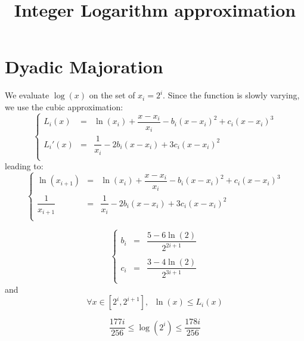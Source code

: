 \documentclass[aps]{revtex4}
\begin{document}
\title{Integer Logarithm approximation}
\maketitle

\section{Dyadic Majoration}
We evaluate $\log(x)$ on the set of $x_i=2^i$.
Since the function is slowly varying, we use the cubic approximation:
\begin{equation}
\left\lbrace
\begin{array}{rcl}
	L_i(x)  & = & \ln(x_i) + \dfrac{x-x_i}{x_i} - b_i \left(x-x_i\right)^2 + c_i \left(x-x_i\right)^3\\
	L_i'(x) & = & \dfrac{1}{x_i} - 2b_i \left(x-x_i\right) + 3 c_i  \left(x-x_i\right)^2 \\
\end{array}
\right.
\end{equation}
leading to:
\begin{equation}
\left\lbrace
\begin{array}{rcl}
	\ln(x_{i+1})       & = & \ln(x_i) + \dfrac{x-x_i}{x_i} - b_i \left(x-x_i\right)^2 + c_i \left(x-x_i\right)^3\\
	\dfrac{1}{x_{i+1}} & = & \dfrac{1}{x_i} - 2b_i \left(x-x_i\right) + 3 c_i  \left(x-x_i\right)^2 \\
\end{array}
\right.
\end{equation}

\begin{equation}
\left\lbrace
\begin{array}{rcl}
b_i  & = & \dfrac{5-6\ln(2)}{2^{2i+1}}\\
\\
c_ i & = & \dfrac{3-4\ln(2)}{2^{3i+1}}\\
\end{array}
\right.
\end{equation}
and
\begin{equation}
\forall x\in[2^i,2^{i+1}], \;\; \ln(x) \leq L_i(x)
\end{equation}


\begin{equation}
	\dfrac{177 i}{256} \leq \log\left(2^i\right) \leq \dfrac{178 i}{256}
\end{equation}
\end{document}
